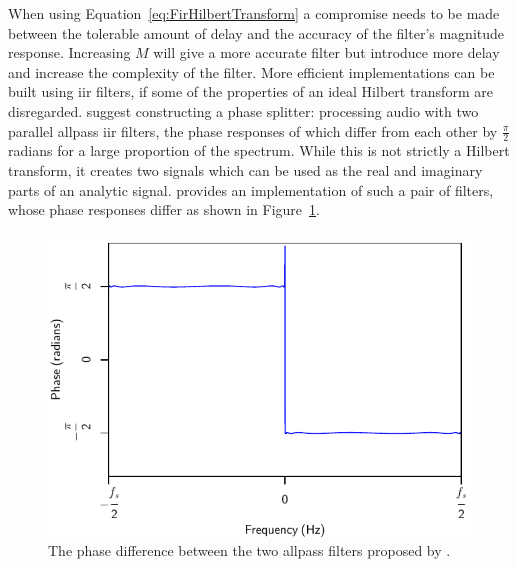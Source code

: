 			When using Equation~\ref{eq:FirHilbertTransform} a compromise needs to be made between the
			tolerable amount of delay and the accuracy of the filter's magnitude response. Increasing $M$ will
			give a more accurate filter but introduce more delay and increase the complexity of the filter.
			More efficient implementations can be built using \acrshort{iir} filters, if some of the properties
			of an ideal Hilbert transform are disregarded.  \citet{oppenheim2014discrete} suggest constructing
			a phase splitter: processing audio with two parallel allpass \acrshort{iir} filters, the phase
			responses of which differ from each other by $\frac{\pi}{2}$ radians for a large proportion of the
			spectrum. While this is not strictly a Hilbert transform, it creates two signals which can be used
			as the real and imaginary parts of an analytic signal. \citet{niemitalo2003hilbert} provides an
			implementation of such a pair of filters, whose phase responses differ as shown in
			Figure~\ref{fig:IIRHilbertPhase}.

			\begin{figure}[h!]
				\centering
				\includegraphics{chapter2/Images/IIRHilbertPhaseResponses.pdf}
				\caption{The phase difference between the two allpass filters proposed by
					 \citet{niemitalo2003hilbert}.}
				\label{fig:IIRHilbertPhase}
			\end{figure}

